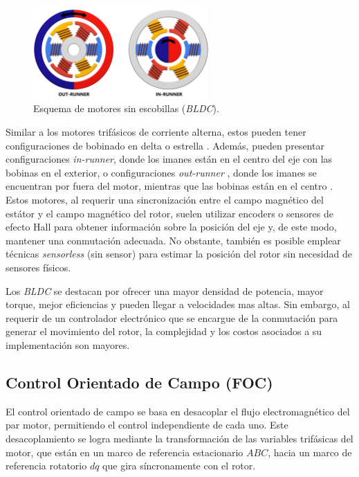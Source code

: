 \documentclass[11pt]{report}
\begin{document}
\begin{figure}[ht]
	\centering
	\includegraphics[width=0.6\textwidth]{imagenes/OUT_IN_BLDC_SF}
	\caption{Esquema de motores sin escobillas (\textit{BLDC}).}
	\label{fig:motor_sin_escobillas}
\end{figure}
\FloatBarrier

Similar a los motores trifásicos de corriente alterna, estos pueden tener configuraciones de bobinado en delta o estrella \cite{Millet2022}. Además, pueden presentar configuraciones \textit{in-runner}, donde los imanes están en el centro del eje con las bobinas en el exterior, o configuraciones \textit{out-runner} , donde los imanes se encuentran por fuera del motor, mientras que las bobinas están en el centro \cite{9774372}. Estos motores, al requerir una sincronización entre el campo magnético del estátor y el campo magnético del rotor, suelen utilizar encoders o sensores de efecto Hall para obtener información sobre la posición del eje y, de este modo, mantener una conmutación adecuada. No obstante, también es posible emplear técnicas \textit{sensorless} (sin sensor) para estimar la posición del rotor sin necesidad de sensores físicos. \cite{Gualtieri2018_STEP}

Los \textit{BLDC} se destacan por ofrecer una mayor densidad de potencia, mayor torque, mejor eficiencias y pueden llegar a velocidades mas altas. Sin embargo, al requerir de un controlador electrónico que se encargue de la conmutación para generar el movimiento del rotor, la complejidad y los costos asociados a su implementación son mayores. \cite{AN885}

\newpage
\subsection{Control Orientado de Campo (FOC)}
El control orientado de campo se basa en desacoplar el flujo electromagnético del par motor, permitiendo el control independiente de cada uno. Este desacoplamiento se logra mediante la transformación de las variables trifásicas del motor, que están en un marco de referencia estacionario \(ABC\), hacia un marco de referencia rotatorio \(dq\) que gira síncronamente con el rotor. \cite{power_conv_14}
\end{document}
